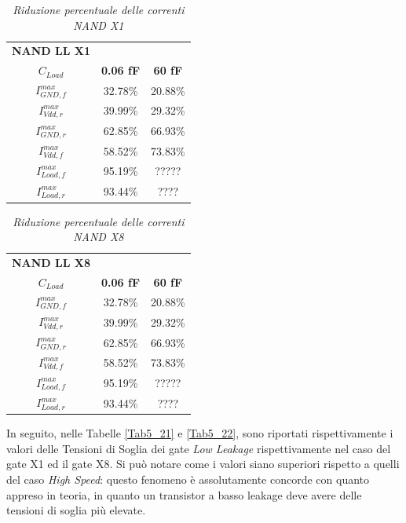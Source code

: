 \begin{table}[!h]\footnotesize
	\centering
	\begin{tabular}{|c|c|c|}
		\hline
		\textbf{NAND LL X1} & &\\
		\textbf{$C_{Load}$} & \textbf{0.06 fF} & \textbf{60 fF}\\
		\hline
		$I_{GND, f}^{max}$ &32.78\%  &20.88\% \\
		
		$I_{Vdd, r}^{max}$ &39.99\% &29.32\% \\
		
		$I_{GND, r}^{max}$&62.85\% &66.93\%\\
		
		$I_{Vdd, f}^{max}$&58.52\% &73.83\% \\
		
		$I_{Load, f}^{max}$ &95.19\% &?????\\
		
		$I_{Load, r}^{max}$ &93.44\% &????  \\
		\hline
	\end{tabular}
	\caption{\textit{Riduzione percentuale delle correnti NAND X1}}
	\label{Tab5_19}
\end{table}
\begin{table}[!h]\footnotesize
	\centering
	\begin{tabular}{|c|c|c|}
		\hline
		\textbf{NAND LL X8} & &\\
		\textbf{$C_{Load}$} & \textbf{0.06 fF} & \textbf{60 fF}\\
		\hline
		$I_{GND, f}^{max}$ &32.78\%  &20.88\% \\
		
		$I_{Vdd, r}^{max}$ &39.99\% &29.32\% \\
		
		$I_{GND, r}^{max}$&62.85\% &66.93\%\\
		
		$I_{Vdd, f}^{max}$&58.52\% &73.83\% \\
		
		$I_{Load, f}^{max}$ &95.19\% &?????\\
		
		$I_{Load, r}^{max}$ &93.44\% &????  \\
		\hline
	\end{tabular}
	\caption{\textit{Riduzione percentuale delle correnti NAND X8}}
	\label{Tab5_20}
\end{table}
\newpage
\noindent In seguito, nelle Tabelle \ref{Tab5_21} e \ref{Tab5_22}, sono riportati rispettivamente i valori delle Tensioni di Soglia dei gate \textit{Low Leakage} rispettivamente nel caso del gate X1 ed il gate X8. Si può notare come i valori siano superiori rispetto a quelli del caso \textit{High Speed}: questo fenomeno è assolutamente concorde con quanto appreso in teoria, in quanto un transistor a basso leakage deve avere delle tensioni di soglia più elevate.
